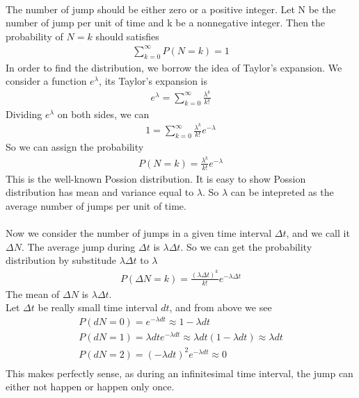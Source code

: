\documentclass[a4paper]{article}
\begin{document}
\\
The number of jump should be either zero or a positive integer. Let N be the number of jump per unit of time and k be a nonnegative integer. Then the probability of $N = k$ should satisfies
\begin{align*}
	\sum_{k = 0}^\infty P(N = k) = 1
\end{align*}
In order to find the distribution, we borrow the idea of Taylor's expansion. We consider a function $e^{\lambda}$, its Taylor's expansion is
\begin{align*}
	e^{\lambda} = \sum_{k = 0}^\infty \frac{\lambda^k}{k!}
\end{align*}
Dividing $e^{\lambda}$ on both sides, we can
\begin{align*}
	1 = \sum_{k = 0}^\infty \frac{\lambda^k}{k!}e^{-\lambda} 
\end{align*}
So we can assign the probability
\begin{align*}
P(N = k) = \frac{\lambda^k}{k!}e^{-\lambda}
\end{align*}
This is the well-known Possion distribution. It is easy to show Possion distribution has mean and variance equal to $\lambda$. So $\lambda$ can be intepreted as the average number of jumps per unit of time.\\

\\
Now we consider the number of jumps in a given time interval $\Delta t$, and we call it $\Delta N$. The average jump during $\Delta t$ is $\lambda \Delta t$. So we can get the probability distribution by substitude $\lambda \Delta t$ to $\lambda$
\begin{align*}
	P(\Delta N = k) = \frac{(\lambda \Delta t)^k}{k!}e^{-\lambda \Delta t}
\end{align*}
The mean of $\Delta N$ is $\lambda \Delta t$.\\

Let $\Delta t$ be really small time interval $dt$, and from above we see
\begin{align*}
	P(dN = 0) = e^{-\lambda dt} \approx 1 - \lambda dt \\
	P(dN = 1) = \lambda dt e^{-\lambda dt} \approx \lambda dt (1 - \lambda dt) \approx \lambda dt \\
	P(dN = 2) = (-\lambda dt)^2 e^{- \lambda dt} \approx 0 \\
\end{align*}
This makes perfectly sense, as during an infinitesimal time interval, the jump can either not happen or happen only once.\\
\end{document}
